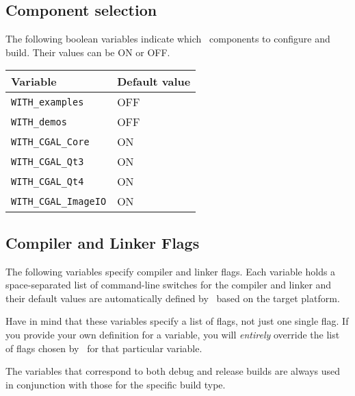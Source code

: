 \subsection{Component selection}

The following boolean variables indicate which \cgal\ components to configure and build. Their values can be ON or OFF.

{\ccTexHtml{\small}{}
\renewcommand{\arraystretch}{1.3}
\gdef\lcTabularBorder{2}
\begin{tabular}{|l|l|} \hline
  \textbf{Variable}            & \textbf{Default value}\\\hline\hline
  \texttt{WITH\_examples}      & OFF\\\hline
  \texttt{WITH\_demos}         & OFF\\\hline
  \texttt{WITH\_CGAL\_Core}    & ON\\\hline
  \texttt{WITH\_CGAL\_Qt3}     & ON\\\hline
  \texttt{WITH\_CGAL\_Qt4}     & ON\\\hline
  \texttt{WITH\_CGAL\_ImageIO} & ON\\\hline
\end{tabular}
}

\subsection{Compiler and Linker Flags}

The following variables specify compiler and linker flags. Each variable holds a 
space-separated list of command-line switches for the compiler and linker and 
their default values are automatically defined by \cmake\ based on the target platform.

Have in mind that these variables specify a list of flags, not just one
single flag. If you provide your own definition for a variable, you will {\em entirely} override
the list of flags chosen by \cmake\ for that particular variable.

The variables that correspond to both debug and release builds are always
used in conjunction with those for the specific build type.

